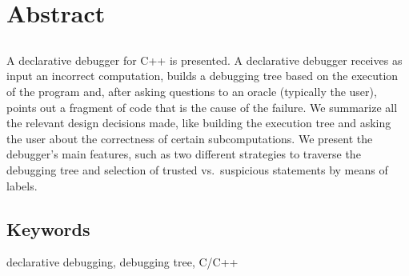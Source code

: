 \chapter*{Abstract}

\section*{\tituloPortadaEngVal}

A declarative debugger for C++ is presented. A declarative debugger receives as input an incorrect computation, builds a debugging tree based on the execution of the program and, after asking questions to an oracle (typically the user), points out a fragment of code that is the cause of the failure. We summarize all the relevant design decisions made, like building the execution tree and asking the user about the correctness of certain subcomputations. We present the debugger’s main features, such as two different strategies to traverse the debugging tree and selection of trusted vs.\ suspicious statements by means of labels.

\section*{Keywords}

\noindent declarative debugging, debugging tree, C/C++



